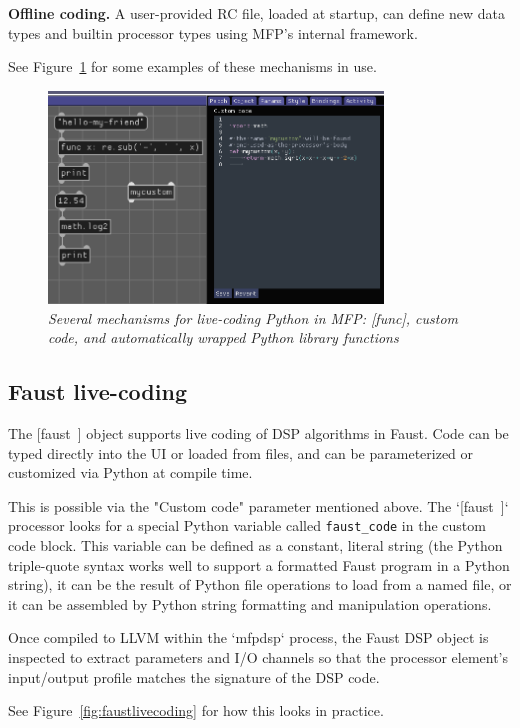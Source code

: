 \documentclass[a4paper]{article}
\begin{document}
{\bf Offline coding.} A user-provided RC file, loaded at startup,
can define new data types and builtin processor types using MFP's
internal framework.

See Figure~\ref{fig:pythonlivecoding} for some examples of these
mechanisms in use.

\begin{figure}[ht]
\centerline{\includegraphics[width=3.5in]{python_livecoding.png}}
\caption{\label{fig:pythonlivecoding}{
    \it Several mechanisms for live-coding Python in MFP:
    [func], custom code, and automatically wrapped Python
    library functions
}}
\end{figure}

\subsection{Faust live-coding }

The [faust~] object supports live coding of DSP algorithms in
Faust. Code can be typed directly into the UI or loaded from
files, and can be parameterized or customized via Python at
compile time.

This is possible via the "Custom code" parameter mentioned above.
The `[faust~]` processor looks for a special Python variable
called {\tt faust\_code} in the custom code block. This variable
can be defined as a constant, literal string (the Python
triple-quote syntax works well to support a formatted Faust
program in a Python string), it can be the result of Python file
operations to load from a named file, or it can be assembled by
Python string formatting and manipulation operations.

Once compiled to LLVM within the `mfpdsp` process, the Faust DSP
object is inspected to extract parameters and I/O channels so
that the processor element's input/output profile matches the
signature of the DSP code.

See Figure~\ref{fig:faustlivecoding} for how this looks in
practice.
\end{document}
